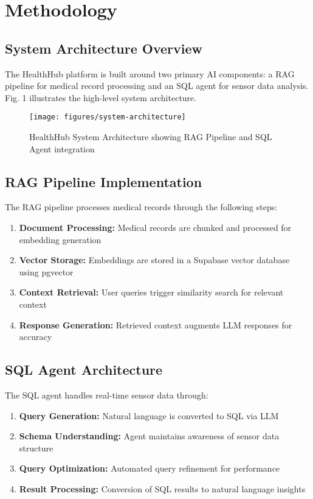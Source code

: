 \section{Methodology}

\subsection{System Architecture Overview}
The HealthHub platform is built around two primary AI components: a RAG pipeline for medical record processing and an SQL agent for sensor data analysis. Fig. 1 illustrates the high-level system architecture.

\begin{figure}[!t]
\centering
\texttt{[image: figures/system-architecture]}
\caption{HealthHub System Architecture showing RAG Pipeline and SQL Agent integration}
\label{fig:system-architecture}
\end{figure}

\subsection{RAG Pipeline Implementation}
The RAG pipeline processes medical records through the following steps:

\begin{enumerate}
\item \textbf{Document Processing:} Medical records are chunked and processed for embedding generation
\item \textbf{Vector Storage:} Embeddings are stored in a Supabase vector database using pgvector
\item \textbf{Context Retrieval:} User queries trigger similarity search for relevant context
\item \textbf{Response Generation:} Retrieved context augments LLM responses for accuracy
\end{enumerate}

\subsection{SQL Agent Architecture}
The SQL agent handles real-time sensor data through:

\begin{enumerate}
\item \textbf{Query Generation:} Natural language is converted to SQL via LLM
\item \textbf{Schema Understanding:} Agent maintains awareness of sensor data structure
\item \textbf{Query Optimization:} Automated query refinement for performance
\item \textbf{Result Processing:} Conversion of SQL results to natural language insights
\end{enumerate}

